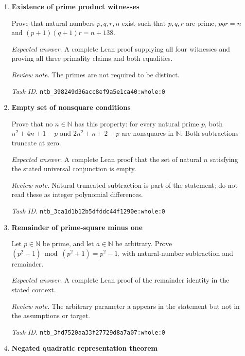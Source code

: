 \documentclass[11pt]{article}
\newcommand{\pth}[1]{\nolinkurl{#1}}
\begin{document}
\begin{enumerate}[label={TEST \arabic*.},leftmargin=4.5em,itemsep=1em]
\emph{Expected answer.} A complete Lean proof of the full conjunction, including the universal prime claim, the concrete divisor count and the nonexistence claim.

\emph{Task ID.} \pth{ntb_38d4e0e8d6c4a9e630133c64:whole:0}

\item \textbf{Existence of prime product witnesses}\label{qn:test:20}

Prove that natural numbers $p,q,r,n$ exist such that $p,q,r$ are prime, $pqr=n$ and $(p+1)(q+1)r=n+138$.

\emph{Expected answer.} A complete Lean proof supplying all four witnesses and proving all three primality claims and both equalities.

\emph{Review note.} The primes are not required to be distinct.

\emph{Task ID.} \pth{ntb_398249d36acc8ef9a5e1ca40:whole:0}

\item \textbf{Empty set of nonsquare conditions}\label{qn:test:21}

Prove that no $n\in\mathbb{N}$ has this property: for every natural prime $p$, both $n^2+4n+1-p$ and $2n^2+n+2-p$ are nonsquares in $\mathbb{N}$. Both subtractions truncate at zero.

\emph{Expected answer.} A complete Lean proof that the set of natural $n$ satisfying the stated universal conjunction is empty.

\emph{Review note.} Natural truncated subtraction is part of the statement; do not read these as integer polynomial differences.

\emph{Task ID.} \pth{ntb_3ca1d1b12b5dfddc44f1290e:whole:0}

\item \textbf{Remainder of prime-square minus one}\label{qn:test:22}

Let $p\in\mathbb{N}$ be prime, and let $a\in\mathbb{N}$ be arbitrary. Prove $(p^2-1)\bmod(p^2+1)=p^2-1$, with natural-number subtraction and remainder.

\emph{Expected answer.} A complete Lean proof of the remainder identity in the stated context.

\emph{Review note.} The arbitrary parameter a appears in the statement but not in the assumptions or target.

\emph{Task ID.} \pth{ntb_3fd7520aa33f27729d8a7a07:whole:0}

\item \textbf{Negated quadratic representation theorem}\label{qn:test:23}


\end{enumerate}
\end{document}
